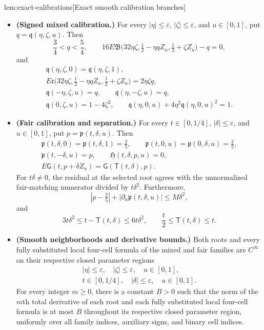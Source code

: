 \begin{lemmav}{lem:exact-calibrations}[Exact smooth calibration branches]
\begin{itemize}
\item \textbf{(Signed mixed calibration.)}
For every \(|\eta|\le\varepsilon\), \(|\zeta|\le\varepsilon\), and \(u\in[0,1]\), put
\(q=\mathfrak q(\eta,\zeta,u)\). Then
\[
\frac34<q<\frac54,\qquad
16E\mathfrak B
 \bigl(32\eta\zeta,\tfrac12-\eta qZ_u,\tfrac12+\zeta Z_u\bigr)-q=0,
\]
and
\[
\begin{gathered}
\mathfrak q(\eta,\zeta,0)=\mathfrak q(\eta,\zeta,1),\\
E\mathfrak c
 \bigl(32\eta\zeta,\tfrac12-\eta qZ_u,\tfrac12+\zeta Z_u\bigr)
 =2\eta\zeta q,\\
\mathfrak q(-\eta,\zeta,u)=q,\qquad
\mathfrak q(\eta,-\zeta,u)=q,\\
\mathfrak q(0,\zeta,u)=1-4\zeta^2,\qquad
\mathfrak q(\eta,0,u)+4\eta^2\mathfrak q(\eta,0,u)^2=1.
\end{gathered}
\]

\item \textbf{(Fair calibration and separation.)}
For every \(t\in[0,1/4]\), \(|\delta|\le\varepsilon\), and \(u\in[0,1]\), put
\(p=\mathfrak p(t,\delta,u)\). Then
\[
\begin{gathered}
\mathfrak p(t,\delta,0)=\mathfrak p(t,\delta,1)=\frac25,\qquad
\mathfrak p(t,0,u)=\mathfrak p(0,\delta,u)=\frac25,\\
\mathfrak p(t,-\delta,u)=p,\qquad
\mathfrak H(t,\delta,p,u)=0,\\
E\mathsf G(t,p+\delta Z_u)=\mathsf G(\mathsf T(t,\delta),p).
\end{gathered}
\]
For \(t\delta\ne0\), the residual at the selected root agrees with the unnormalized fair-matching numerator divided by \(t\delta^2\). Furthermore,
\[
|p-\tfrac25|+|\partial_u\mathfrak p(t,\delta,u)|\le M\delta^2,
\]
and
\[
3t\delta^2\le t-\mathsf T(t,\delta)\le6t\delta^2,\qquad
\frac t2\le\mathsf T(t,\delta)\le t.
\]

\item \textbf{(Smooth neighborhoods and derivative bounds.)}
Both roots and every fully substituted local four-cell formula of the mixed and fair families are \(C^\infty\) on their respective closed parameter regions
\[
\begin{gathered}
|\eta|\le\varepsilon,\quad |\zeta|\le\varepsilon,\quad u\in[0,1],\\
t\in[0,1/4],\quad |\delta|\le\varepsilon,\quad u\in[0,1].
\end{gathered}
\]
For every integer \(m\ge0\), there is a constant \(B>0\) such that the norm of the \(m\)th total derivative of each root and each fully substituted local four-cell formula is at most \(B\) throughout its respective closed parameter region, uniformly over all family indices, auxiliary signs, and binary cell indices.


\end{itemize}
\end{lemmav}
